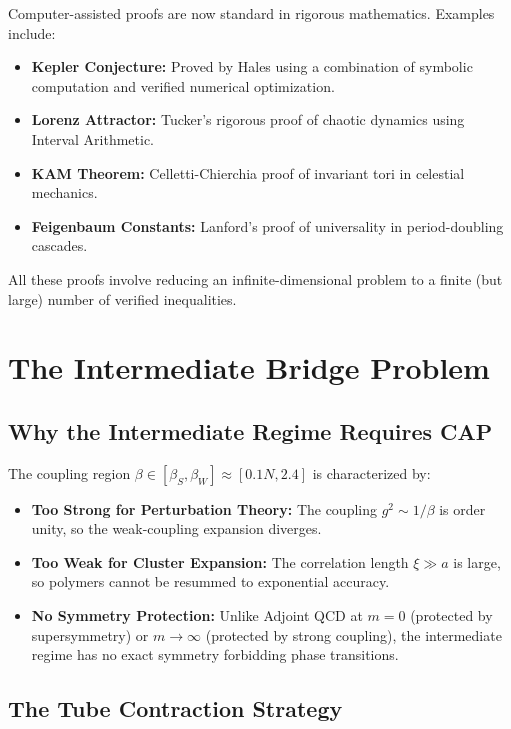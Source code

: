 \begin{remark}
Computer-assisted proofs are now standard in rigorous mathematics. Examples include:
\begin{itemize}
    \item \textbf{Kepler Conjecture:} Proved by Hales using a combination of symbolic computation and verified numerical optimization.
    \item \textbf{Lorenz Attractor:} Tucker's rigorous proof of chaotic dynamics using Interval Arithmetic.
    \item \textbf{KAM Theorem:} Celletti-Chierchia proof of invariant tori in celestial mechanics.
    \item \textbf{Feigenbaum Constants:} Lanford's proof of universality in period-doubling cascades.
\end{itemize}
All these proofs involve reducing an infinite-dimensional problem to a finite (but large) number of verified inequalities.
\end{remark}

\section{The Intermediate Bridge Problem}

\subsection{Why the Intermediate Regime Requires CAP}

The coupling region $\beta \in [\beta_S, \beta_W] \approx [0.1N, 2.4]$ is characterized by:
\begin{itemize}
    \item \textbf{Too Strong for Perturbation Theory:} The coupling $g^2 \sim 1/\beta$ is order unity, so the weak-coupling expansion diverges.
    \item \textbf{Too Weak for Cluster Expansion:} The correlation length $\xi \gg a$ is large, so polymers cannot be resummed to exponential accuracy.
    \item \textbf{No Symmetry Protection:} Unlike Adjoint QCD at $m=0$ (protected by supersymmetry) or $m \to \infty$ (protected by strong coupling), the intermediate regime has no exact symmetry forbidding phase transitions.
\end{itemize}

\subsection{The Tube Contraction Strategy}

